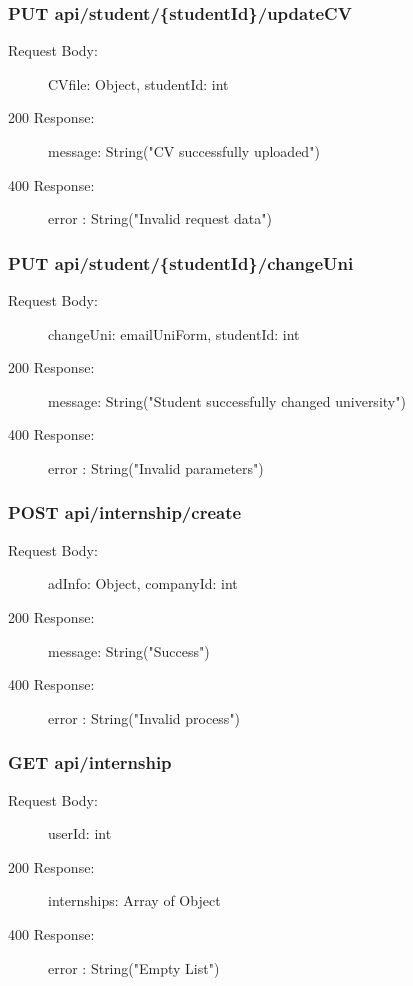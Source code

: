 \documentclass[a4paper,12pt]{article}
\begin{document}
\subsubsection*{PUT api/student/\{studentId\}/updateCV}
\begin{description}
    \item[Request Body:]  CVfile: Object, studentId: int
    \item[200 Response:] message: String("CV successfully uploaded") 
    \item[400 Response:] error : String("Invalid request data")
\end{description}

\subsubsection*{PUT api/student/\{studentId\}/changeUni}
\begin{description}
    \item[Request Body:]  changeUni: emailUniForm, studentId: int
    \item[200 Response:] message: String("Student successfully changed university") 
    \item[400 Response:] error : String("Invalid parameters")
\end{description}

\subsubsection*{POST api/internship/create}
\begin{description}
    \item[Request Body:] adInfo: Object, companyId: int
    \item[200 Response:] message: String("Success") 
    \item[400 Response:] error : String("Invalid process")
\end{description}

\subsubsection*{GET api/internship}
\begin{description}
    \item[Request Body:]  userId: int
    \item[200 Response:] internships: Array of Object
    \item[400 Response:] error : String("Empty List")
\end{description}
\end{document}
